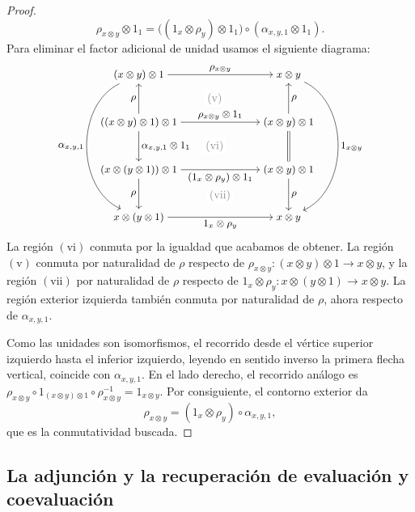 \begin{proof}
\[
\rho_{x\otimes y}\otimes1_1
=\bigl((1_x\otimes\rho_y)\otimes1_1\bigr)
\circ(\alpha_{x,y,1}\otimes1_1).
\]
Para eliminar el factor adicional de unidad usamos el siguiente diagrama:
\[
\begin{tikzcd}[
    row sep=large,
    column sep= 7em,
    cramped,
    cells={nodes={font=\small}},
    every label/.append style={font=\small}
]
    (x\otimes y)\otimes1
        \arrow[r,"\rho_{x\otimes y}"]
        \arrow[ddd,bend right=65,"\alpha_{x,y,1}"']
    & x\otimes y
        \arrow[ddd,bend left=65,"1_{x\otimes y}"]
    \\
    ((x\otimes y)\otimes1)\otimes1
        \arrow[u,"\rho"]
        \arrow[r,"\rho_{x\otimes y}\otimes1_1"]
        \arrow[d,"\alpha_{x,y,1}\otimes1_1"]
    & (x\otimes y)\otimes1
        \arrow[u,"\rho"']
        \arrow[d,equal]
    \\
    (x\otimes(y\otimes1))\otimes1
        \arrow[r,"(1_x\otimes\rho_y)\otimes1_1"']
        \arrow[d,"\rho"']
    & (x\otimes y)\otimes1
        \arrow[d,"\rho"]
    \\
    x\otimes(y\otimes1)
        \arrow[r,"1_x\otimes\rho_y"']
    & x\otimes y
    \arrow[phantom,from=1-1,to=2-2,"\mathrm{\color{grisCIMAT}(v)}" description]
    \arrow[phantom,from=2-1,to=3-2,"\mathrm{\color{grisCIMAT}(vi)}" description]
    \arrow[phantom,from=3-1,to=4-2,"\mathrm{\color{grisCIMAT}(vii)}" description]
\end{tikzcd}
\]
La región $(\mathrm{vi})$ conmuta por la igualdad que acabamos de obtener. La región $(\mathrm{v})$ conmuta por naturalidad de $\rho$ respecto de $\rho_{x\otimes y}\colon(x\otimes y)\otimes1\to x\otimes y$, y la región $(\mathrm{vii})$ por naturalidad de $\rho$ respecto de $1_x\otimes\rho_y\colon x\otimes(y\otimes1)\to x\otimes y$.
La región exterior izquierda también conmuta por naturalidad de $\rho$, ahora respecto de $\alpha_{x,y,1}$. 

Como las unidades son isomorfismos, el recorrido desde el vértice superior izquierdo hasta el inferior izquierdo, leyendo en sentido inverso la primera flecha vertical, coincide con $\alpha_{x,y,1}$. En el lado derecho, el recorrido análogo es $\rho_{x\otimes y}\circ1_{(x\otimes y)\otimes1}\circ\rho_{x\otimes y}^{-1}=1_{x\otimes y}$. Por consiguiente, el contorno exterior da
\[
\rho_{x\otimes y}=(1_x\otimes\rho_y)\circ\alpha_{x,y,1},
\]
que es la conmutatividad buscada.
\end{proof}

\subsection{La adjunción y la recuperación de evaluación y coevaluación}

